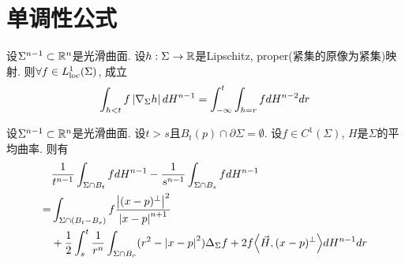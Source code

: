 \section{单调性公式}
\begin{proposition}[余面积公式]
    设$\Sigma^{n-1}\subset \mathbb{R}^n$是光滑曲面.  设$h: \Sigma \to \mathbb{R}$是Lipschitz, proper(紧集的原像为紧集)映射.  则$\forall f \in L^1_{\text{loc}}(\Sigma)$, 成立
    \begin{equation}
        \int_{h < t} f \left | \nabla_\Sigma h \right |dH^{n-1}=\int^t_{-\infty} \int_{h=r}f dH^{n-2}dr
    \end{equation}
\end{proposition}
\begin{proposition}
设$\Sigma^{n-1}\subset \mathbb{R}^n$是光滑曲面. 设$t>s$且$B_t(p) \cap \partial \Sigma =\emptyset$. 设$f \in C^1(\Sigma)$, $H$是$\Sigma$的平均曲率.  则有    
\begin{equation}
    \begin{split}
        &\frac{1}{t^{n-1}}\int_{\Sigma\cap B_t} f dH^{n-1}-\frac{1}{s^{n-1}}\int_{\Sigma\cap B_s} f dH^{n-1} \\
        =& \int_{\Sigma \cap (B_t-B_s)} f \frac{\left | (x-p)^\perp \right |^2}{\left | x-p \right |^{n+1}} \\
        &+\frac{1}{2}\int^t_s \frac{1}{r^n}\int_{\Sigma\cap B_r}(r^2-\left | x-p \right |^2)\Delta_{\Sigma}f+2f{\left < \vec{H}, (x-p)^\perp \right >}dH^{n-1}dr
    \end{split}
\end{equation}
\end{proposition}

